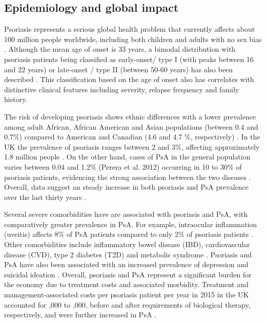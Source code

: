 \subsection{Epidemiology and global impact}
%
Psoriasis represents a serious global health problem that currently affects about 100 million people worldwide, including both children and adults with  no sex bias \parencite{Organization2016}. Although the mean age of onset is 33 years, a bimodal distribution with psoriasis patients being classified as early-onset/ type I (with peaks between 16 and 22 years) or late-onset / type II (between 50-60 years) has also been described \parencite{Henseler1985, Perera2012}. This classification based on the age of onset also has correlates with distinctive clinical features including severity, relapse frequency and family history. 

The risk of developing psoriasis shows ethnic differences with a lower prevalence among adult African, African American and Asian populations (between 0.4 and 0.7\%) compared to American and Canadian (4.6 and 4.7 \%, respectively) \parencite{Jacobson2011}. In the UK the prevalence of psoriasis ranges between 2 and 3\%, affecting approximately 1.8 million people \parencite{Perera2012}. On the other hand, cases of PsA  in the general population varies between 0.04 and 1.2\% (Perera et al. 2012) occurring in 10 to 30\% of psoriasis patients, evidencing the strong association between the two diseases \parencite{Gelfand2005,Reich2015,Perera2012}. Overall, data suggest an steady increase in both psoriasis and PsA prevalence over the last thirty years \parencite{Springate2017,Organization2016}. 


Several severe comorbidities have are associated  with  psoriasis  and PsA, with comparatively greater prevalence in PsA. For example, intraocular inflammation (uveitis) affects 8\% of PsA patients compared to only 2\% of psoriasis patients \parencite{Husted2011, Oliveira2015}. Other comorbidities include inflammatory bowel disease (IBD), cardiovascular disease (CVD), type 2 diabetes (T2D) and metabolic syndrome \parencite{Gelfand2006,Shapiro2007,Cohen2008}. Psoriasis and PsA have also been associated with an increased prevalence of depression and suicidal ideation \parencite{Sampogna2012}. Overall, psoriasis and PsA represent a significant burden for the economy due to treatment costs and associated morbidity. Treatment and management-associated costs per psoriasis patient per year in 2015 in the UK accounted for ,000 to ,000, before and after requirements of biological therapy, respectively, and were further increased in PsA \parencite{Burgos-Pol2016, Poole2010}.




